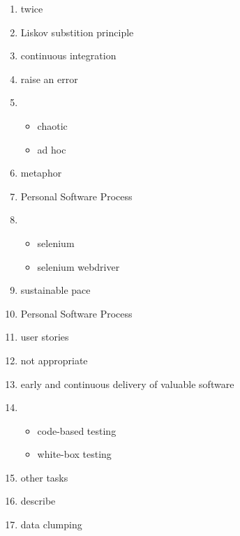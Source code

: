 \documentclass{exam}
\begin{document}
\begin{enumerate}
\begin{itemize}
\end{itemize}
\item twice
\item Liskov substition principle
\item continuous integration
\item raise an error
\item \begin{itemize}
\item chaotic
\item ad hoc
\end{itemize}
\item metaphor
\item Personal Software Process
\item \begin{itemize}
\item selenium
\item selenium webdriver
\end{itemize}
\item sustainable pace
\item Personal Software Process
\item user stories
\item not appropriate
\item early and continuous delivery of valuable software
\item \begin{itemize}
\item code-based testing
\item white-box testing
\end{itemize}
\item other tasks
\item describe
\item data clumping
\end{enumerate}
\end{document}
